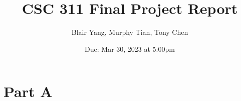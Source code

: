 \documentclass[12pt]{article}
\title{CSC 311 Final Project Report}
\author{Blair Yang, Murphy Tian, Tony Chen} %
\date{Due: Mar 30, 2023 at 5:00pm} %
\begin{document}
\maketitle
\newpage
\section*{Part A}




\end{document}
